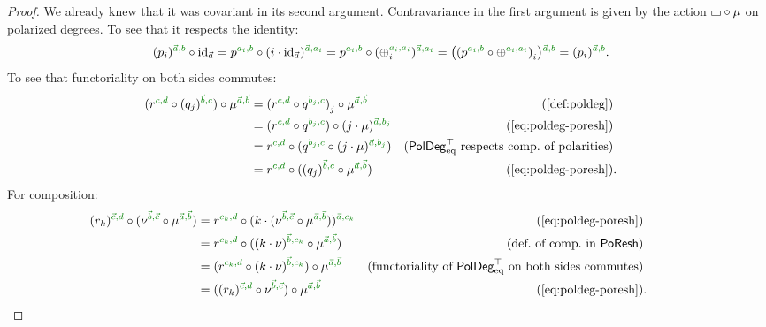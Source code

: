 \documentclass[a4paper]{memoir}
\begin{document}
\begin{proof}
	We already knew that it was covariant in its second argument.
	Contravariance in the first argument is given by the action ${\llcorner\hspace{-.4ex}\lrcorner} \circ \mu$ on polarized degrees.
	To see that it respects the identity:
	\begin{align*}
		(\pdeg p i)\pmrhom{\vec a}{b} \circ \id_{\vec a}
		&= p\pmrhom{a_i}{b} \circ (i \cdot \id_{\vec a})\pmrhom{\vec a}{a_i}
		= p\pmrhom{a_i}{b} \circ (\pdeg \pospol i\pmrhom{a_i}{a_i})\pmrhom{\vec a}{a_i}
		= \paren{  \pdeg {(p\pmrhom{a_i}{b} \circ \pospol\pmrhom{a_i}{a_i})}{i}  }\pmrhom{\vec a}{b}
		= (\pdeg p i)\pmrhom{\vec a}{b}.
	\end{align*}
	To see that functoriality on both sides commutes:
	\begin{align*}
		(r\pmrhom{c}{d} \circ (\pdeg q j)\pmrhom{\vec b}{c}) \circ \mu \pmrhom{\vec a}{\vec b}
		&= \pdeg{(r\pmrhom{c}{d} \circ q\pmrhom{b_j}{c})}{j} \circ \mu \pmrhom{\vec a}{\vec b}
		& \text{(\cref{def:poldeg})} \\
		&= (r\pmrhom{c}{d} \circ q\pmrhom{b_j}{c}) \circ (j \cdot \mu)\pmrhom{\vec a}{b_j}
		& \text{(\cref{eq:poldeg-poresh})} \\
		&= r\pmrhom{c}{d} \circ (q\pmrhom{b_j}{c} \circ (j \cdot \mu)\pmrhom{\vec a}{b_j})
		& \text{($\poldegeqtop$ respects comp.\ of polarities)} \\
		&= r\pmrhom{c}{d} \circ ((\pdeg q j)\pmrhom{\vec b}{c} \circ \mu\pmrhom{\vec a}{\vec b})
		& \text{(\cref{eq:poldeg-poresh})}&.
	\end{align*}
	For composition:
	\begin{align*}
		(\pdeg r k)\pmrhom{\vec c}{d} \circ (\nu\pmrhom{\vec b}{\vec c} \circ \mu\pmrhom{\vec a}{\vec b})
		&= r\pmrhom{c_k}{d} \circ (k \cdot (\nu\pmrhom{\vec b}{\vec c} \circ \mu\pmrhom{\vec a}{\vec b}))\pmrhom{\vec a}{c_k}
		& \text{(\cref{eq:poldeg-poresh})} \\
		&= r\pmrhom{c_k}{d} \circ ((k \cdot \nu)\pmrhom{\vec b}{c_k} \circ \mu\pmrhom{\vec a}{\vec b})
		& \text{(def.\ of comp.\ in $\poreshcat$)} \\
		&= (r\pmrhom{c_k}{d} \circ (k \cdot \nu)\pmrhom{\vec b}{c_k}) \circ \mu\pmrhom{\vec a}{\vec b} 
		& \text{(functoriality of $\poldegeqtop$ on both sides commutes)} \\
		&= ((\pdeg r k)\pmrhom{\vec c}{d} \circ \nu\pmrhom{\vec b}{\vec c}) \circ \mu\pmrhom{\vec a}{\vec b}
		& \text{(\cref{eq:poldeg-poresh})}&.
		& \qquad \qedhere
	\end{align*}
\end{proof}
\end{document}
